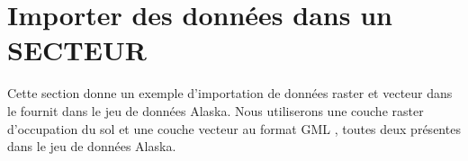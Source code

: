\section{Importer des données dans un SECTEUR \grass}\label{sec:import_loc_data}

Cette section donne un exemple d'importation de données raster et vecteur dans le  \grass {} fournit dans le jeu de données \qg Alaska. Nous utiliserons une couche raster d'occupation du sol  et une couche vecteur au format GML , toutes deux présentes dans le jeu de données Alaska.

